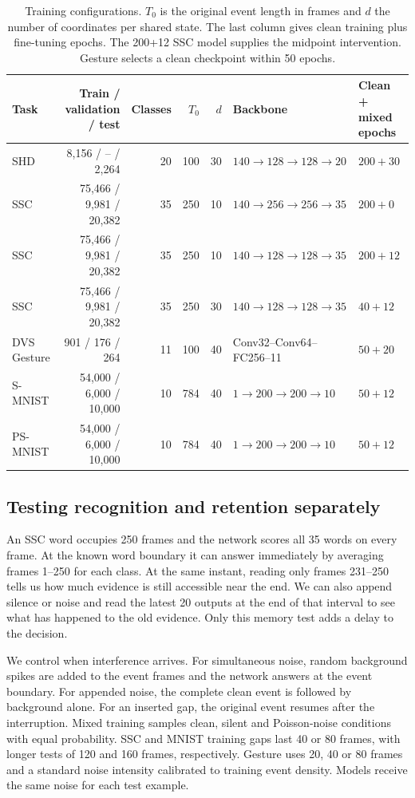 \documentclass[10pt,twocolumn]{article}
\begin{document}
\begin{table}[!tbp]
\centering\small
\caption{Training configurations. $T_0$ is the original event length in frames and $d$ the number of coordinates per shared state. The last column gives clean training plus fine-tuning epochs. The 200+12 SSC model supplies the midpoint intervention. Gesture selects a clean checkpoint within 50 epochs.}
\label{tab:protocol}
\begin{tabular}{lrrrrll}
\toprule
Task & Train / validation / test & Classes & $T_0$ & $d$ & Backbone & Clean + mixed epochs\\
\midrule
SHD & 8,156 / -- / 2,264 & 20 & 100 & 30 & $140\to128\to128\to20$ & $200+30$\\
SSC & 75,466 / 9,981 / 20,382 & 35 & 250 & 10 & $140\to256\to256\to35$ & $200+0$\\
SSC & 75,466 / 9,981 / 20,382 & 35 & 250 & 10 & $140\to128\to128\to35$ & $200+12$\\
SSC & 75,466 / 9,981 / 20,382 & 35 & 250 & 30 & $140\to128\to128\to35$ & $40+12$\\
DVS Gesture & 901 / 176 / 264 & 11 & 100 & 40 & Conv32--Conv64--FC256--11 & $50+20$\\
S-MNIST & 54,000 / 6,000 / 10,000 & 10 & 784 & 40 & $1\to200\to200\to10$ & $50+12$\\
PS-MNIST & 54,000 / 6,000 / 10,000 & 10 & 784 & 40 & $1\to200\to200\to10$ & $50+12$\\
\bottomrule
\end{tabular}
\end{table}

\subsection{Testing recognition and retention separately}
An SSC word occupies 250 frames and the network scores all 35 words on every frame. At the known word boundary it can answer immediately by averaging frames 1--250 for each class. At the same instant, reading only frames 231--250 tells us how much evidence is still accessible near the end. We can also append silence or noise and read the latest 20 outputs at the end of that interval to see what has happened to the old evidence. Only this memory test adds a delay to the decision.

We control when interference arrives. For simultaneous noise, random background spikes are added to the event frames and the network answers at the event boundary. For appended noise, the complete clean event is followed by background alone. For an inserted gap, the original event resumes after the interruption. Mixed training samples clean, silent and Poisson-noise conditions with equal probability. SSC and MNIST training gaps last 40 or 80 frames, with longer tests of 120 and 160 frames, respectively. Gesture uses 20, 40 or 80 frames and a standard noise intensity calibrated to training event density. Models receive the same noise for each test example.
\end{document}

